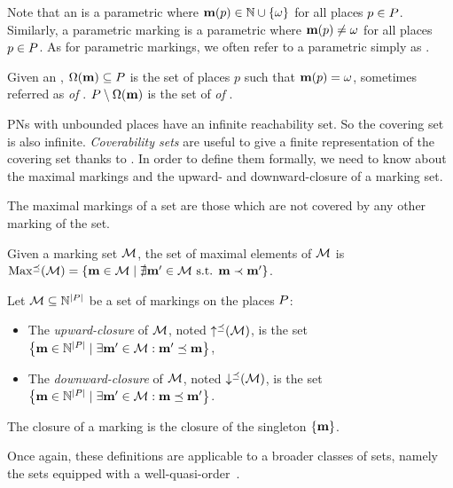Note that an \omark \mar is a parametric \omark where $\mathbf{m}(p) \in \mathbb{N} \cup \{\omega\}$ for all places $p \in P$.
Similarly, a parametric marking \mar is a parametric \omark where $\mathbf{m}(p) \neq \omega$ for all places $p \in P$.
As for parametric markings, we often refer to a parametric \omark simply as \omark.

Given an \omark \mar, $\operatorname{\Omega}(\mathbf{m}) \subseteq P$ is the set of places $p$ such that $\mathbf{m}(p) = \omega$, sometimes referred as \emph{\oplaces of \mar}. $P \setminus \operatorname{\Omega}(\mathbf{m})$ is the set of \emph{\noplaces of \mar}.

\acp{PN} with unbounded places have an infinite reachability set.
So the covering set is also infinite.
\emph{Coverability sets} are useful to give a finite representation of the covering set thanks to \omarks.
In order to define them formally, we need to know about the maximal markings and the upward- and downward-closure of a marking set.

The maximal markings of a set are those which are not covered by any other marking of the set.
\begin{defi}
  Given a marking set  $\mathcal{M}$, the set of maximal elements of $\mathcal{M}$ is
  $\operatorname{Max^\preceq}(\mathcal{M}) = \left\{ \mathbf{m} \in \mathcal{M} \mid \nexists \mathbf{m}' \in \mathcal{M} \text{ s.t. } \mathbf{m} \prec \mathbf{m}' \right\}$.
\end{defi}

\begin{defi}
  Let $\mathcal{M} \subseteq \mathbb{N}^{\left|P\right|}$ be a set of markings on the places $P$:
  \begin{itemize}
    \item The \emph{upward-closure} of $\mathcal{M}$, noted $\operatorname{\uparrow^\preceq}(\mathcal{M})$, is the set
      $\left\{\mathbf{m} \in \mathbb{N}^{\left|P\right|} \mid \exists \mathbf{m}' \in \mathcal{M} : \mathbf{m}' \preceq \mathbf{m}\right\}$,
    \item The \emph{downward-closure} of $\mathcal{M}$, noted $\operatorname{\downarrow^\preceq}(\mathcal{M})$, is the set
      $\left\{\mathbf{m} \in \mathbb{N}^{\left|P\right|} \mid \exists \mathbf{m}' \in \mathcal{M} : \mathbf{m} \preceq \mathbf{m}'\right\}$.
  \end{itemize}
  The closure of a marking \mar is the closure of the singleton $\{\mathbf{m}\}$.
\end{defi}

Once again, these definitions are applicable to
a broader classes of sets, namely the sets equipped with a well-quasi-order~\citep{Abdulla96}.

